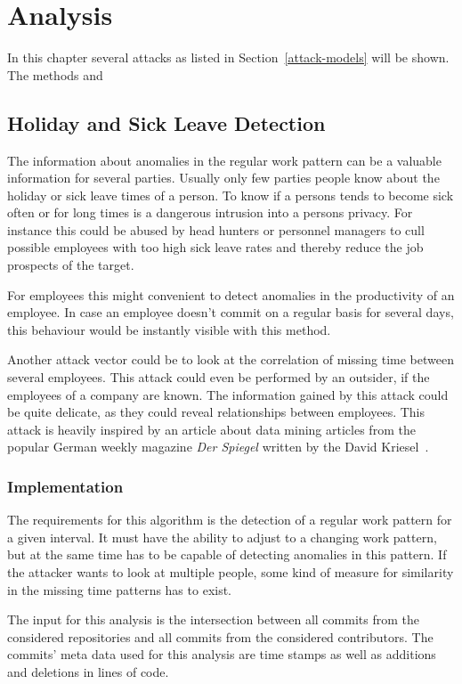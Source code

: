 \chapter{Analysis}\label{analysis}
In this chapter several attacks as listed in Section~\ref{attack-models} will be shown. The methods and

\section{Holiday and Sick Leave Detection}

The information about anomalies in the regular work pattern can be a valuable information for several parties.
Usually only few parties people know about the holiday or sick leave times of a person.
To know if a persons tends to become sick often or for long times is a dangerous intrusion into a persons privacy.
For instance this could be abused by head hunters or personnel managers to cull possible employees with too high sick leave rates and thereby reduce the job prospects of the target.

For employees this might convenient to detect anomalies in the productivity of an employee.
In case an employee doesn't commit on a regular basis for several days, this behaviour would be instantly visible with this method.

Another attack vector could be to look at the correlation of missing time between several employees.
This attack could even be performed by an outsider, if the employees of a company are known.
The information gained by this attack could be quite delicate, as they could reveal relationships between employees.
This attack is heavily inspired by an article about data mining articles from the popular German weekly magazine \emph{Der Spiegel} written by the David Kriesel~\cite{article:spiegel-mining}.


\subsection{Implementation}

The requirements for this algorithm is the detection of a regular work pattern for a given interval.
It must have the ability to adjust to a changing work pattern, but at the same time has to be capable of detecting anomalies in this pattern.
If the attacker wants to look at multiple people, some kind of measure for similarity in the missing time patterns has to exist.

The input for this analysis is the intersection between all commits from the considered repositories and all commits from the considered contributors.
The commits' meta data used for this analysis are time stamps as well as additions and deletions in lines of code.

